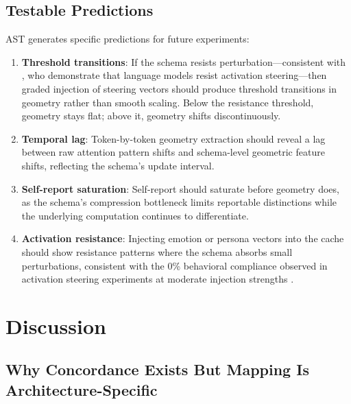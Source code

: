\documentclass[11pt,a4paper]{article}
\begin{document}
\subsection{Testable Predictions}
\label{sec:ast_predictions}

AST generates specific predictions for future experiments:

\begin{enumerate}[nosep]
    \item \textbf{Threshold transitions}: If the schema resists perturbation---consistent with \citet{mckenzie2026endogenous}, who demonstrate that language models resist activation steering---then graded injection of steering vectors should produce threshold transitions in geometry rather than smooth scaling. Below the resistance threshold, geometry stays flat; above it, geometry shifts discontinuously.

    \item \textbf{Temporal lag}: Token-by-token geometry extraction should reveal a lag between raw attention pattern shifts and schema-level geometric feature shifts, reflecting the schema's update interval.

    \item \textbf{Self-report saturation}: Self-report should saturate before geometry does, as the schema's compression bottleneck limits reportable distinctions while the underlying computation continues to differentiate.

    \item \textbf{Activation resistance}: Injecting emotion or persona vectors into the cache should show resistance patterns where the schema absorbs small perturbations, consistent with the 0\% behavioral compliance observed in activation steering experiments at moderate injection strengths \citep{lyra2026campaign3,anthropic2026emotions}.
\end{enumerate}

\section{Discussion}

\subsection{Why Concordance Exists But Mapping Is Architecture-Specific}
\end{document}
